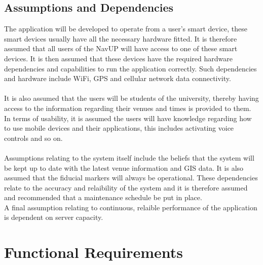 \documentclass{article}
\begin{document}
	
	\subsection{Assumptions and Dependencies}
		The application will be developed to operate from a user's smart device, these smart devices usually have all the necessary hardware fitted. It is therefore assumed that all users of the NavUP will have access to one of these smart devices. It is then assumed that these devices have the required hardware dependencies and capabilities to run the application correctly. Such dependencies and hardware include WiFi, GPS and cellular network data connectivity.\\ \\
		It is also assumed that the users will be students of the university, thereby having access to the information regarding their venues and times is provided to them.\\
		In terms of usability, it is assumed the users will have knowledge regarding how to use mobile devices and their applications, this includes activating voice controls and so on. \\ \\
		Assumptions relating to the system itself include the beliefs that the system will be kept up to date with the latest venue information and GIS data. It is also assumed that the fiducial markers will always be operational. These dependencies relate to the accuracy and relaibility of the system and it is therefore assumed and recommended that a maintenance schedule be put in place.\\
		A final assumption relating to continuous, relaible performance of the application is dependent on server capacity.
		
		
		

\newpage
\section{Functional Requirements}
\end{document}
